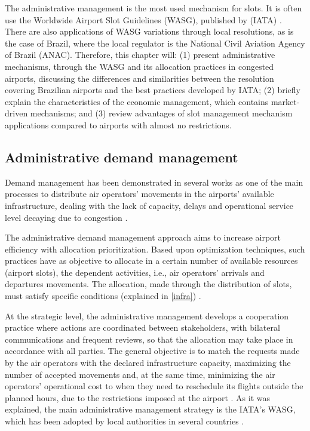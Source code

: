 The administrative management is the most used mechanism for slots. It is often use the Worldwide Airport Slot Guidelines (WASG), published by (IATA) \cite{ribeiro2018optimization}. There are also applications of WASG variations through local resolutions, as is the case of Brazil, where the local regulator is the National Civil Aviation Agency of Brazil (ANAC). Therefore, this chapter will: (1) present administrative mechanisms, through the WASG and its allocation practices in congested airports, discussing the differences and similarities between the resolution covering Brazilian airports and the best practices developed by IATA; (2) briefly explain the characteristics of the economic management, which contains market-driven mechanisms; and (3) review advantages of slot management mechanism applications compared to airports with almost no restrictions.

\subsection{Administrative demand management}
Demand management has been demonstrated in several works as one of the main processes to distribute air operators’ movements in the airports’ available infrastructure, dealing with the lack of capacity, delays and operational service level decaying due to congestion \cite{zografos2017increasing, ribeiro2018optimization}.

The administrative demand management approach aims to increase airport efficiency with allocation prioritization. Based upon optimization techniques, such practices have as objective to allocate in a certain number of available resources (airport slots), the dependent activities, i.e., air operators’ arrivals and departures movements. The allocation, made through the distribution of slots, must satisfy specific conditions (explained in \ref{infra}) \cite{zografos2017increasing}.

At the strategic level, the administrative management develops a cooperation practice where actions are coordinated between stakeholders, with bilateral communications and frequent reviews, so that the allocation may take place in accordance with all parties. The general objective is to match the requests made by the air operators with the declared infrastructure capacity, maximizing the number of accepted movements and, at the same time, minimizing the air operators’ operational cost to when they need to reschedule its flights outside the planned hours, due to the restrictions imposed at the airport \cite {gillen2016airport}. As it was explained, the main administrative management strategy is the IATA’s WASG, which has been adopted by local authorities in several countries \cite{zografos2017increasing, fairbrother2018development, cavusoglu2021minimum}.

